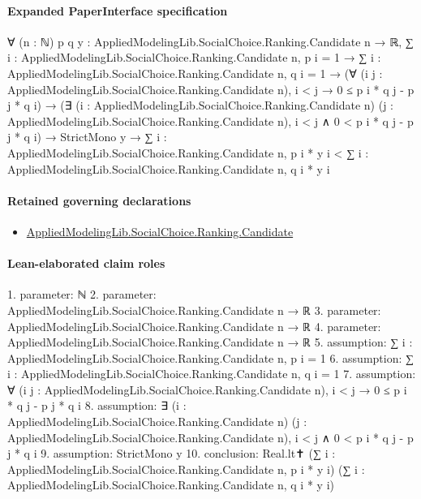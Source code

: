 \documentclass[10pt]{article}
\begin{document}
\paragraph{Expanded PaperInterface specification}
\begin{ReviewVerbatim}
∀ (n : ℕ) {p q y : AppliedModelingLib.SocialChoice.Ranking.Candidate n → ℝ},
  ∑ i : AppliedModelingLib.SocialChoice.Ranking.Candidate n, p i = 1 →
    ∑ i : AppliedModelingLib.SocialChoice.Ranking.Candidate n, q i = 1 →
      (∀ (i j : AppliedModelingLib.SocialChoice.Ranking.Candidate n), i < j → 0 ≤ p i * q j - p j * q i) →
        (∃ (i : AppliedModelingLib.SocialChoice.Ranking.Candidate n) (j :
            AppliedModelingLib.SocialChoice.Ranking.Candidate n), i < j ∧ 0 < p i * q j - p j * q i) →
          StrictMono y →
            ∑ i : AppliedModelingLib.SocialChoice.Ranking.Candidate n, p i * y i <
              ∑ i : AppliedModelingLib.SocialChoice.Ranking.Candidate n, q i * y i
\end{ReviewVerbatim}

\paragraph{Retained governing declarations}
\begin{itemize}\raggedright
\item \hyperlink{library-prerequisite-8c0e6c25845ae78a}{Applied\allowbreak{}Modeling\allowbreak{}Lib.\allowbreak{}Social\allowbreak{}Choice.\allowbreak{}Ranking.\allowbreak{}Candidate}
\end{itemize}
\paragraph{Lean-elaborated claim roles}\begin{ReviewVerbatim}
1. parameter: ℕ
2. parameter: AppliedModelingLib.SocialChoice.Ranking.Candidate n → ℝ
3. parameter: AppliedModelingLib.SocialChoice.Ranking.Candidate n → ℝ
4. parameter: AppliedModelingLib.SocialChoice.Ranking.Candidate n → ℝ
5. assumption: ∑ i : AppliedModelingLib.SocialChoice.Ranking.Candidate n, p i = 1
6. assumption: ∑ i : AppliedModelingLib.SocialChoice.Ranking.Candidate n, q i = 1
7. assumption: ∀ (i j : AppliedModelingLib.SocialChoice.Ranking.Candidate n), i < j → 0 ≤ p i * q j - p j * q i
8. assumption: ∃ (i : AppliedModelingLib.SocialChoice.Ranking.Candidate n) (j : AppliedModelingLib.SocialChoice.Ranking.Candidate n),
  i < j ∧ 0 < p i * q j - p j * q i
9. assumption: StrictMono y
10. conclusion: Real.lt✝ (∑ i : AppliedModelingLib.SocialChoice.Ranking.Candidate n, p i * y i)
  (∑ i : AppliedModelingLib.SocialChoice.Ranking.Candidate n, q i * y i)
\end{ReviewVerbatim}
\end{document}
